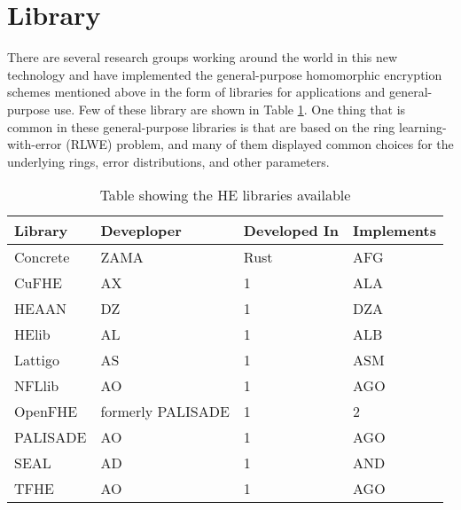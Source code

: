 \section{Library}
There are several research groups working around the world in this new technology and have implemented the general-purpose homomorphic encryption schemes mentioned above in the form of  libraries for applications and general-purpose use. Few of these library are shown in Table \ref{Tab:Crypt_library}. One thing that is common in these general-purpose libraries is that are based on the ring learning-with-error (RLWE) problem, and many of them displayed common choices for the underlying rings, error distributions, and other parameters.

\begin{table}
    \begin{tabular}{ |p{2.5cm}||p{3.5cm}|p{3cm}|p{3cm}|}
        \hline
        Library          & Deveploper        & Developed In & Implements \\
        \hline
        Concrete \cite{} & ZAMA              & Rust         & AFG        \\
        CuFHE    \cite{} & AX                & 1            & ALA        \\
        HEAAN    \cite{} & DZ                & 1            & DZA        \\
        HElib    \cite{} & AL                & 1            & ALB        \\
        Lattigo  \cite{} & AS                & 1            & ASM        \\
        NFLlib   \cite{} & AO                & 1            & AGO        \\
        OpenFHE  \cite{} & formerly PALISADE & 1            & 2          \\
        PALISADE \cite{} & AO                & 1            & AGO        \\
        SEAL     \cite{} & AD                & 1            & AND        \\
        TFHE     \cite{} & AO                & 1            & AGO        \\
        \hline
    \end{tabular}
    \caption{Table showing the HE libraries available}
    \label{Tab:Crypt_library}
\end{table}




